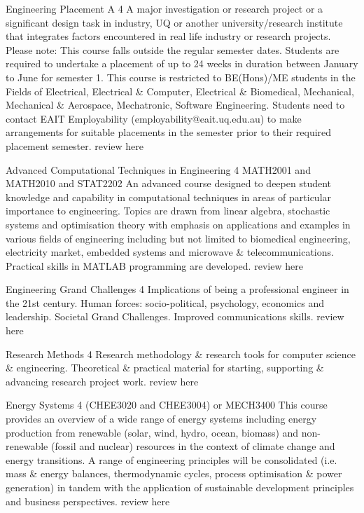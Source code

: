 	{Engineering Placement A}
	{4}
	{}
	{}
	{}
	{A major investigation or research project or a significant design task in industry, UQ or another university/research institute that integrates factors encountered in real life industry or research projects. Please note: This course falls outside the regular semester dates. Students are required to undertake a placement of up to 24 weeks in duration between January to June for semester 1. This course is restricted to BE(Hons)/ME students in the Fields of Electrical, Electrical \& Computer, Electrical \& Biomedical, Mechanical, Mechanical \& Aerospace, Mechatronic, Software Engineering. Students need to contact EAIT Employability (employability@eait.uq.edu.au) to make arrangements for suitable placements in the semester prior to their required placement semester.}
	{review here}

	{Advanced Computational Techniques in Engineering}
	{4}
	{MATH2001 and MATH2010 and STAT2202}
	{}
	{}
	{An advanced course designed to deepen student knowledge and capability in computational techniques in areas of particular importance to engineering. Topics are drawn from linear algebra, stochastic systems and optimisation theory with emphasis on applications and examples in various fields of engineering including but not limited to biomedical engineering, electricity market, embedded systems and microwave \& telecommunications. Practical skills in MATLAB programming are developed.}
	{review here}

	{Engineering Grand Challenges}
	{4}
	{}
	{}
	{}
	{Implications of being a professional engineer in the 21st century. Human forces: socio-political, psychology, economics and leadership. Societal Grand Challenges. Improved communications skills.}
	{review here}

	{Research Methods}
	{4}
	{}
	{}
	{}
	{Research methodology \& research tools for computer science \& engineering. Theoretical \& practical material for starting, supporting \& advancing research project work.}
	{review here}

	{Energy Systems}
	{4}
	{(CHEE3020 and CHEE3004) or MECH3400}
	{}
	{}
	{This course provides an overview of a wide range of energy systems including energy production from renewable (solar, wind, hydro, ocean, biomass) and non-renewable (fossil and nuclear) resources in the context of climate change and energy transitions. A range of engineering principles will be consolidated (i.e. mass \& energy balances, thermodynamic cycles, process optimisation \& power generation) in tandem with the application of sustainable development principles and business perspectives.}
	{review here}

